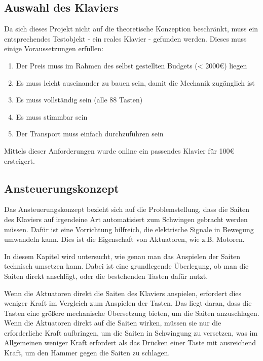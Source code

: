 \subsection{Auswahl des Klaviers}


Da sich dieses Projekt nicht auf die theoretische Konzeption beschränkt, muss ein entsprechendes Testobjekt - ein reales Klavier - gefunden werden.
Dieses muss einige Voraussetzungen erfüllen:
\begin{enumerate}
	\item 	Der Preis muss im Rahmen des selbst gestellten Budgets (< 2000\euro{}) liegen
	\item 	Es muss leicht auseinander zu bauen sein, damit die Mechanik zugänglich ist
	\item 	Es muss vollständig sein (alle 88 Tasten)
	\item 	Es muss stimmbar sein
	\item 	Der Transport muss einfach durchzuführen sein
\end{enumerate}

Mittels dieser Anforderungen wurde online ein passendes Klavier für 100\euro{} ersteigert.

\subsection{Ansteuerungskonzept} \label{subsec:konzeptionhw-ansteuerungskonzept}


Das Ansteuerungskonzept bezieht sich auf die Problemstellung, dass die Saiten des Klaviers auf irgendeine Art automatisiert zum Schwingen gebracht werden müssen.
Dafür ist eine Vorrichtung hilfreich, die elektrische Signale in Bewegung umwandeln kann.
Dies ist die Eigenschaft von Aktuatoren, wie z.B. Motoren.

In diesem Kapitel wird untersucht, wie genau man das Anspielen der Saiten technisch umsetzen kann.
Dabei ist eine grundlegende Überlegung, ob man die Saiten direkt anschlägt,
oder die bestehenden Tasten dafür nutzt.

Wenn die Aktuatoren direkt die Saiten des Klaviers anspielen, erfordert dies weniger Kraft im Vergleich zum
Anspielen der Tasten. Das liegt daran, dass die Tasten eine größere mechanische Übersetzung bieten, um die Saiten
anzuschlagen. Wenn die Aktuatoren direkt auf die Saiten wirken, müssen sie nur die erforderliche Kraft aufbringen, um
die Saiten in Schwingung zu versetzen, was im Allgemeinen weniger Kraft erfordert als das Drücken einer Taste mit
ausreichend Kraft, um den Hammer gegen die Saiten zu schlagen.

